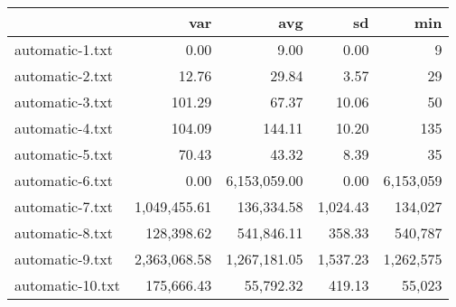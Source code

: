 \begin{tabular}{lrrrr}
  \toprule  & var & avg & sd & min \\ 
  \midrule automatic-1.txt & 0.00 & 9.00 & 0.00 & 9 \\ 
  automatic-2.txt & 12.76 & 29.84 & 3.57 & 29 \\ 
  automatic-3.txt & 101.29 & 67.37 & 10.06 & 50 \\ 
  automatic-4.txt & 104.09 & 144.11 & 10.20 & 135 \\ 
  automatic-5.txt & 70.43 & 43.32 & 8.39 & 35 \\ 
  automatic-6.txt & 0.00 & 6,153,059.00 & 0.00 & 6,153,059 \\ 
  automatic-7.txt & 1,049,455.61 & 136,334.58 & 1,024.43 & 134,027 \\ 
  automatic-8.txt & 128,398.62 & 541,846.11 & 358.33 & 540,787 \\ 
  automatic-9.txt & 2,363,068.58 & 1,267,181.05 & 1,537.23 & 1,262,575 \\ 
  automatic-10.txt & 175,666.43 & 55,792.32 & 419.13 & 55,023 \\ 
   \bottomrule \end{tabular}
